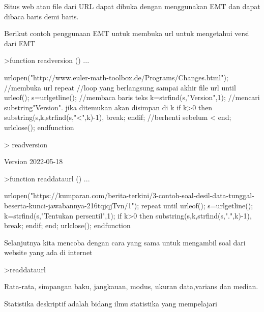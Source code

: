 \documentclass[a4paper,10pt]{article}
\begin{document}
\begin{eulernotebook}
\begin{eulercomment}
\begin{eulercomment}
\begin{eulercomment}
\begin{eulercomment}
\begin{eulercomment}
\begin{eulercomment}
\begin{eulercomment}
\begin{eulercomment}
\begin{eulercomment}
\begin{eulercomment}
\begin{eulercomment}
Situs web atau file dari URL dapat dibuka dengan menggunakan EMT dan
dapat dibaca baris demi baris.

Berikut contoh penggunaan EMT untuk membuka url untuk mengetahui versi
dari EMT
\end{eulercomment}
\begin{eulerprompt}
>function readversion () ...
\end{eulerprompt}
\begin{eulerudf}
  urlopen("http://www.euler-math-toolbox.de/Programs/Changes.html"); //membuka url
  repeat //loop yang berlangsung sampai akhir file url
  until urleof();
  s=urlgetline();  //membaca baris teks
  k=strfind(s,"Version",1);  //mencari substring"Version". jika ditemukan akan disimpan di k
  if k>0 then substring(s,k,strfind(s,"<",k)-1), break; endif; //berhenti sebelum <
  end;
  urlclose();
  endfunction
\end{eulerudf}
\begin{eulerprompt}
> readversion
\end{eulerprompt}
\begin{euleroutput}
  Version 2022-05-18
\end{euleroutput}
\begin{eulerprompt}
>function readdataurl () ...
\end{eulerprompt}
\begin{eulerudf}
  urlopen("https://kumparan.com/berita-terkini/3-contoh-soal-desil-data-tunggal-beserta-kunci-jawabannya-216tqjqjTvn/1");
  repeat
  until urleof();
  s=urlgetline();
  k=strfind(s,"Tentukan persentil",1);
  if k>0 then substring(s,k,strfind(s,".",k)-1), break; endif;
  end;
  urlclose();
  endfunction
\end{eulerudf}
\begin{eulercomment}
Selanjutnya kita mencoba dengan cara yang sama untuk mengambil soal
dari website yang ada di internet
\end{eulercomment}
\begin{eulerprompt}
>readdataurl
\end{eulerprompt}
\begin{eulercomment}
Rata-rata, simpangan baku, jangkauan, modus, ukuran data,varians dan
median.\\
\begin{eulercomment}
\begin{eulercomment}
Statistika deskriptif adalah bidang ilmu statistika yang mempelajari

\end{eulercomment}
\end{eulercomment}
\end{eulercomment}
\end{eulercomment}
\end{eulercomment}
\end{eulercomment}
\end{eulercomment}
\end{eulercomment}
\end{eulercomment}
\end{eulercomment}
\end{eulercomment}
\end{eulercomment}
\end{eulercomment}
\end{eulernotebook}
\end{document}
